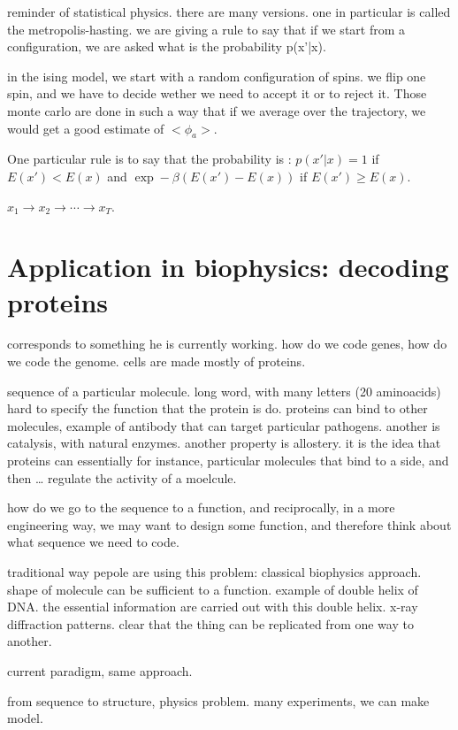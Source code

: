 reminder of statistical physics.
there are many versions. one in particular is called the metropolis-hasting.
we are giving a rule to say that if we start from a configuration, we are asked
what is the probability p(x'|x).

in the ising model, we start with a random configuration of spins. we flip one
spin, and we have to decide wether we need to accept it or to reject it.
Those monte carlo are done in such a way that if we average over the trajectory,
we would get a good estimate of $<\phi_a>$.

One particular rule is to say that the probability is :
$p(x'|x) = 1$ if $E(x') < E(x)$ and $\exp -\beta (E(x')-E(x))$ if $E(x')\geq E(x)$.

$x_1 \rightarrow x_2 \rightarrow \cdots \rightarrow x_T$.




\section{Application in biophysics: decoding proteins}

corresponds to something he is currently working.
how do we code genes, how do we code the genome. cells are made mostly of
proteins.

sequence of a particular molecule.
long word, with many letters (20 aminoacids)
hard to specify the function that the protein is do.
proteins can bind to other molecules, example of antibody that can target
particular pathogens.
another is catalysis, with natural enzymes.
another property is allostery. it is the idea that proteins can essentially 
for instance, particular molecules that bind to a side, and then \dots
regulate the activity of a moelcule.

how do we go to the sequence to a function, and reciprocally, in a more
engineering way, we may want to design some function, and therefore
think about what sequence we need to code.

traditional way pepole are using this problem: classical biophysics approach.
shape of molecule can be sufficient to a function. example of double helix of
DNA. the essential information are carried out with this double helix. x-ray 
diffraction patterns.
clear that the thing can be replicated from one way to another.

current paradigm, same approach.

from sequence to structure, physics problem.
many experiments, we can make model.

